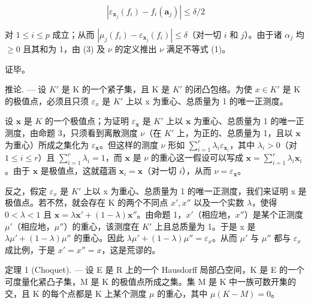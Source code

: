 \[
\left| \varepsilon_ {\mathbf {x} _ {j}} (f _ {i}) - f _ {i} (\mathbf {a} _ {j}) \right| \leqslant \delta / 2
\]

对 \(1 \leqslant i \leqslant p\) 成立；从而 \(|\mu_j(f_i) - \varepsilon_{\mathbf{x}_j}(f_i)| \leqslant \delta\)（对一切 \(i\) 和 \(j\)）。由于诸 \(\alpha_j\) 均 \(\geqslant 0\) 且其和为 1，由 (3) 及 \(\nu\) 的定义推出 \(\nu\) 满足不等式 (1)。

证毕。

推论. --- 设 \(K'\) 是 K 的一个紧子集，且 K 是 \(K'\) 的闭凸包络。为使 \(x \in K'\) 是 K 的极值点，必须且只须 \(\varepsilon_{x}\) 是 \(K'\) 上以 x 为重心、总质量为 1 的唯一正测度。

设 \(\mathbf{x}\) 是 \(K\) 的一个极值点；为证明 \(\varepsilon_{\mathbf{x}}\) 是 \(K'\) 上以 \(\mathbf{x}\) 为重心、总质量为 1 的唯一正测度，由命题 3，只须看到离散测度 \(\nu\)（在 \(K'\) 上，为正的、总质量为 1，且以 \(\mathbf{x}\) 为重心）所成之集化为 \(\varepsilon_{\mathbf{x}}\)。但这样的测度 \(\nu\) 形如 \(\sum_{i=1}^{r} \lambda_i \varepsilon_{\mathbf{x}_i}\)，其中 \(\lambda_i > 0\)（对 \(1 \leqslant i \leqslant r\)）且 \(\sum_{i=1}^{r} \lambda_i = 1\)，而 \(\mathbf{x}\) 是 \(\nu\) 的重心这一假设可以写成 \(\mathbf{x} = \sum_{i=1}^{r} \lambda_i \mathbf{x}_i\)。由于 \(\mathbf{x}\) 是极值点，这就蕴涵 \(\mathbf{x}_i = \mathbf{x}\)（对一切 \(i\)），从而 \(\nu = \varepsilon_{\mathbf{x}}\)。

反之，假定 \(\varepsilon_{x}\) 是 \(K'\) 上以 x 为重心、总质量为 1 的唯一正测度，我们来证明 x 是极值点。若不然，就会存在 K 的两个不同点 \(x', x''\) 以及一个实数 \(\lambda\)，使得 \(0 < \lambda < 1\) 且 \(\mathbf{x} = \lambda\mathbf{x}' + (1 - \lambda)\mathbf{x}''\)。由命题 1，\(x'\)（相应地，\(x''\)）是某个正测度 \(\mu'\)（相应地，\(\mu''\)）的重心，该测度在 \(K'\) 上且总质量为 1。于是 x 是 \(\lambda\mu' + (1 - \lambda)\mu''\) 的重心。因此 \(\lambda\mu' + (1 - \lambda)\mu'' = \varepsilon_{x}\)。从而 \(\mu'\) 与 \(\mu''\) 都与 \(\varepsilon_{x}\) 成比例，于是 \(x' = x'' = x\)，这是荒谬的。

定理 1 (Choquet). --- 设 E 是 R 上的一个 Hausdorff 局部凸空间，K 是 E 的一个可度量化紧凸子集，M 是 K 的极值点所成之集。集 M 是 K 中一族可数开集的交，且 K 的每个点都是 K 上某个测度 \(\mu\) 的重心，其中 \(\mu(K - M) = 0\)。

